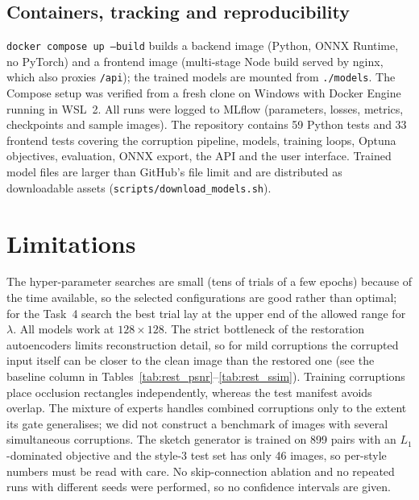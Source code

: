 \documentclass[conference]{IEEEtran}
\begin{document}
\subsection{Containers, tracking and reproducibility}
\texttt{docker compose up --build} builds a backend image (Python, ONNX Runtime, no PyTorch) and a frontend image (multi-stage Node build served by nginx, which also proxies \texttt{/api}); the trained models are mounted from \texttt{./models}. The Compose setup was verified from a fresh clone on Windows with Docker Engine running in WSL~2.
All runs were logged to MLflow (parameters, losses, metrics, checkpoints and sample images). The repository contains 59 Python tests and 33 frontend tests covering the corruption pipeline, models, training loops, Optuna objectives, evaluation, ONNX export, the API and the user interface.
Trained model files are larger than GitHub's file limit and are distributed as downloadable assets (\texttt{scripts/download\_models.sh}).

\section{Limitations}
The hyper-parameter searches are small (tens of trials of a few epochs) because of the time available, so the selected configurations are good rather than optimal; for the Task~4 search the best trial lay at the upper end of the allowed range for $\lambda$.
All models work at $128\times128$. The strict bottleneck of the restoration autoencoders limits reconstruction detail, so for mild corruptions the corrupted input itself can be closer to the clean image than the restored one (see the baseline column in Tables~\ref{tab:rest_psnr}--\ref{tab:rest_ssim}).
Training corruptions place occlusion rectangles independently, whereas the test manifest avoids overlap. The mixture of experts handles combined corruptions only to the extent its gate generalises; we did not construct a benchmark of images with several simultaneous corruptions.
The sketch generator is trained on 899 pairs with an $L_1$-dominated objective and the style-3 test set has only 46 images, so per-style numbers must be read with care. No skip-connection ablation and no repeated runs with different seeds were performed, so no confidence intervals are given.
\end{document}
